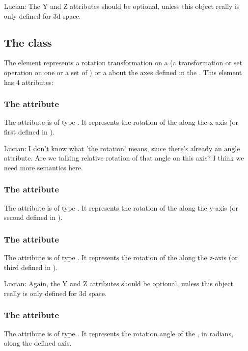 {\color{red} Lucian: \notice The Y and Z attributes should be optional, unless this object really is only defined for 3d space.}

\subsection{The  class}
\label{CSGRotation-class}
The \CSGRotation element represents a rotation transformation on a \CSGNode (a transformation or set operation on one or a set of \CSGPrimitives) or a \CSGPrimitive about the axes defined in the \Geometry. This element has 4 attributes:

\subsubsection{The  attribute}
The  attribute is of type . It represents the rotation of the \CSGNode along the x-axis (or first \CoordinateComponent defined in \Geometry).

{\color{red} Lucian: \notice I don't know what 'the rotation' means, since there's already an angle attribute.  Are we talking relative rotation of that angle on this axis?  I think we need more semantics here.}

\subsubsection{The  attribute}
The  attribute is of type . It represents the rotation of the \CSGNode along the y-axis (or second \CoordinateComponent defined in \Geometry).

\subsubsection{The  attribute}
The  attribute is of type . It represents the rotation of the \CSGNode along the z-axis (or third \CoordinateComponent defined in \Geometry).

{\color{red} Lucian: \notice Again, the Y and Z attributes should be optional, unless this object really is only defined for 3d space.}

\subsubsection{The  attribute}
The  attribute is of type . It represents the rotation angle of the \CSGNode, in radians, along the defined axis.


